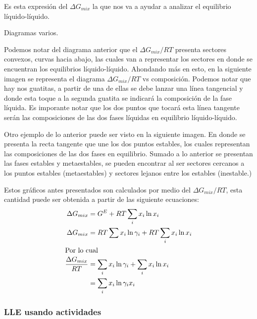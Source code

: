Es esta expresión del $\Delta G_{mix}$ la que nos va a ayudar a analizar el equilibrio líquido-líquido.

\begin{images}{Diagramas varios.}
\end{images}

Podemos notar del diagrama anterior que el $\Delta G_{mix}/RT$ presenta sectores convexos, curvas hacia abajo, las cuales van a representar los sectores en donde se encuentran los equilibrios líquido-líquido.
Ahondando más en esto, en la siguiente imagen se representa el diagrama $\Delta G_{mix}/RT$ vs composición. Podemos notar que hay nos guatitas, a partir de una de ellas se debe lanzar una línea tangencial y donde esta toque 
a la segunda guatita se indicará la composición de la fase líquida. Es imporante notar que los dos puntos que tocará esta línea tangente serán las composiciones de las dos fases líquidas en equilibrio líquido-líquido.

Otro ejemplo de lo anterior puede ser visto en la siguiente imagen. En donde se presenta la recta tangente que une los dos puntos estables, los cuales representan las composiciones de las dos fases en equilibrio. Sumado a lo anterior 
se presentan las fases estables y metaestables, se pueden encontrar al ser sectores cercanos a los puntos estables (metaestables) y sectores lejanos entre los estables (inestable.)

Estos gráficos antes presentados son calculados por medio del $\Delta G_{mix}/RT$, esta cantidad puede ser obtenida a partir de las siguiente ecuaciones:
\begin{align}
    \Delta G_{mix}&=G^{E}+RT\sum_i x_i \ln x_i\\
    \Delta G_{mix}&=RT \sum x_i \ln \gamma_i + RT\sum_i x_i \ln x_i \\
    \intertext{Por lo cual}
    \frac{\Delta G_{mix}}{RT}&=\sum_i x_i \ln \gamma_i + \sum_i x_i \ln x_i \\
    &= \sum_i x_i \ln \gamma_i x_i
\end{align}

\subsubsection{LLE usando actividades}

